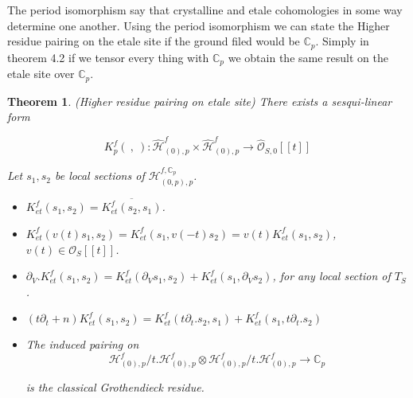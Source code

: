 \documentclass[12pt,twoside]{amsart}
\newtheorem{theorem}{Theorem}[section]
\begin{document}
\vspace{0.5cm}

\noindent
The period isomorphism say that crystalline and etale cohomologies in some way determine one another. Using the period isomorphism we can state the Higher residue pairing on the etale site if the ground filed would be $\mathbb{C}_p$. Simply in theorem 4.2 if we tensor every thing with $\mathbb{C}_p$ we obtain the same result on the etale site over $\mathbb{C}_p$.

\vspace{0.5cm}

\begin{theorem} (Higher residue pairing on etale site)
There exists a sesqui-linear form 

\[ K_p^f( \ , \ ):\widehat{\mathcal{H}}_{(0),p}^f \times \widehat{\mathcal{H}}_{(0),p}^f \to \widehat{\mathcal{O}}_{S,0}[[t]] \]

\vspace{0.5cm}

\noindent
Let $s_1,s_2$ be local sections of $\mathcal{H}_{(0,p),p}^{f,\mathbb{C}_p}$.

\vspace{0.5cm}

\begin{itemize}
\item $K_{et}^f(s_1,s_2)=\overline{K_{et}^f(s_2,s_1)}$.

\vspace{0.2cm}

\item $K_{et}^f(v(t)s_1,s_2)=K_{et}^f(s_1,v(-t)s_2)=v(t)K_{et}^f(s_1,s_2)$, $v(t) \in \mathcal{O}_S[[t]]$.

\vspace{0.2cm}

\item $\partial_V.K_{et}^f(s_1,s_2)=K_{et}^f(\partial_Vs_1,s_2)+K_{et}^f(s_1,\partial_Vs_2)$, for any local section of $T_S$.

\vspace{0.2cm}

\item $(t\partial_t+n)K_{et}^f(s_1,s_2)=K_{et}^f(t\partial_t.s_2,s_1)+K_{et}^f(s_1,t \partial_t.s_2)$

\vspace{0.2cm}

\item The induced pairing on 
\[ \mathcal{H}_{(0),p}^f/t.\mathcal{H}_{(0),p}^f \otimes \mathcal{H}_{(0),p}^f/t.\mathcal{H}_{(0),p}^f \to \mathbb{C}_p \]

\vspace{0.5cm}

\noindent
is the classical Grothendieck residue.

\end{itemize}
\end{theorem}
\end{document}

